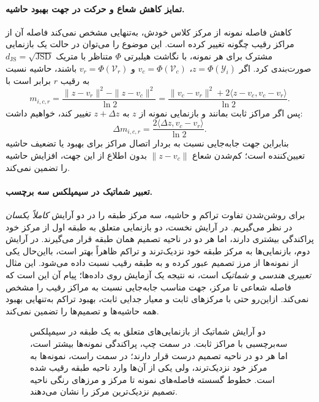 \paragraph{تمایز کاهش شعاع و حرکت در جهت بهبود حاشیه.}
کاهش فاصله نمونه از مرکز کلاس خودش، به‌تنهایی مشخص نمی‌کند
فاصله آن از مراکز رقیب چگونه تغییر کرده است. این موضوع را
می‌توان در حالت یک بازنمایی مشترک برای هر نمونه، با
نگاشت هیلبرتی $\Phi$ متناظر با متریک
$d_{\mathrm{JS}}=\sqrt{\operatorname{JSD}}$ صورت‌بندی کرد.
اگر $z=\Phi(\mathscr Y_i)$، $v_c=\Phi(\mathcal V_c)$ و
$v_r=\Phi(\mathcal V_r)$ باشند، حاشیه نسبت به رقیب $r$
برابر است با
\begin{equation}\label{eq:ch3-fixed-center-pairwise-js-margin}
m_{i,c,r}
=\frac{\|z-v_r\|^2-\|z-v_c\|^2}{\ln2}
=\frac{\|v_c-v_r\|^2+2\langle z-v_c,v_c-v_r\rangle}{\ln2}.
\end{equation}
پس اگر مراکز ثابت بمانند و بازنمایی نمونه از $z$ به
$z+\Delta z$ تغییر کند، خواهیم داشت:
\begin{equation}\label{eq:ch3-fixed-center-pairwise-js-change}
\Delta m_{i,c,r}
=\frac{2\langle\Delta z,v_c-v_r\rangle}{\ln2}.
\end{equation}
بنابراین جهت جابه‌جایی نسبت به بردار اتصال مراکز برای
بهبود یا تضعیف حاشیه تعیین‌کننده است؛ کم‌شدن شعاع
$\|z-v_c\|$ بدون اطلاع از این جهت، افزایش حاشیه را
تضمین نمی‌کند.


\paragraph{تعبیر شماتیک در سیمپلکس سه برچسب.}
برای روشن‌شدن تفاوت تراکم و حاشیه،
سه مرکز طبقه را در دو آرایش
\emph{کاملاً یکسان} در نظر می‌گیریم.
در آرایش نخست، دو بازنمایی
متعلق به طبقه اول از مرکز
خود پراکندگی بیشتری دارند،
اما هر دو در ناحیه تصمیم
همان طبقه قرار می‌گیرند.
در آرایش دوم، بازنمایی‌ها
به مرکز طبقه خود نزدیک‌ترند
و تراکم ظاهراً بهتر است،
بااین‌حال یکی از نمونه‌ها
از مرز تصمیم عبور کرده و
به طبقه رقیب نسبت داده
می‌شود. این مثال
\emph{تعبیری هندسی و شماتیک}
است، نه نتیجه یک آزمایش
روی داده‌ها؛ پیام آن
این است که فاصله
شعاعی تا مرکز،
جهت مناسب جابه‌جایی
نسبت به مراکز رقیب
را مشخص نمی‌کند.
ازاین‌رو حتی با
مرکزهای ثابت و
معیار جدایی ثابت،
بهبود تراکم به‌تنهایی
بهبود همه حاشیه‌ها
و تصمیم‌ها را
تضمین نمی‌کند.

\begin{figure}[htbp]
\centering
\resizebox{0.98\linewidth}{!}{%
%
}
\caption{دو آرایش شماتیک از بازنمایی‌های متعلق به یک طبقه در سیمپلکس سه‌برچسبی با مراکز ثابت. در سمت چپ، پراکندگی نمونه‌ها بیشتر است، اما هر دو در ناحیه تصمیم درست قرار دارند؛ در سمت راست، نمونه‌ها به مرکز خود نزدیک‌ترند، ولی یکی از آن‌ها وارد ناحیه طبقه رقیب شده است. خطوط گسسته فاصله‌های نمونه تا مرکز و مرزهای رنگی ناحیه تصمیم نزدیک‌ترین مرکز را نشان می‌دهند.}
\label{fig:ch3-margin-vs-compactness}
\end{figure}

